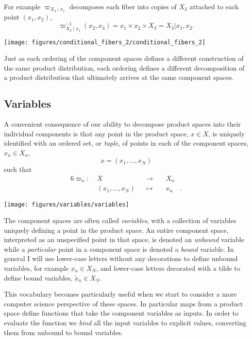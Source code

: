 \documentclass[]{article}
\begin{document}
For example \(\varpi_{X_{2} \mid x_{1}}\) decomposes each fiber into
copies of \(X_{3}\) attached to each point \((x_{1}, x_{2})\), \[
\varpi_{X_{2} \mid x_{1}}^{-1}(x_{2}, x_{3})
= x_{1} \times x_{2} \times X_{3}
= X_{3} | x_{1}, x_{2}.
\]

\texttt{[image: figures/conditional\_fibers\_2/conditional\_fibers\_2]}

Just as each ordering of the component spaces defines a different
construction of the same product distribution, each ordering defines a
different decomposition of a product distribution that ultimately
arrives at the same component spaces.

\hypertarget{variables}{%
\subsection{Variables}\label{variables}}

A convenient consequence of our ability to decompose product spaces into
their individual components is that any point in the product space,
\(x \in X\), is uniquely identified with an ordered set, or
\emph{tuple}, of points in each of the component spaces,
\(x_{n} \in X_{n}\), \[
x = (x_{1}, \ldots, x_{N})
\] such that \[
\begin{aligned}{6}
\varpi_{n} :\; &X& &\rightarrow& \; &X_{n}&
\\
&(x_{1}, \ldots, x_{N})& &\mapsto& &x_{n}&.
\end{aligned}
\]

\texttt{[image: figures/variables/variables]}

The component spaces are often called \emph{variables}, with a
collection of variables uniquely defining a point in the product space.
An entire component space, interpreted as an unspecified point in that
space, is denoted an \emph{unbound} variable while a \emph{particular}
point in a component space is denoted a \emph{bound} variable. In
general I will use lower-case letters without any decorations to define
unbound variables, for example \(x_{n} \in X_{N}\), and lower-case
letters decorated with a tilde to define bound variables,
\(\tilde{x}_{n} \in X_{N}\).

This vocabulary becomes particularly useful when we start to consider a
more computer science perspective of these spaces. In particular maps
from a product space define functions that take the component variables
as inputs. In order to evaluate the function we \emph{bind} all the
input variables to explicit values, converting them from unbound to
bound variables.
\end{document}
